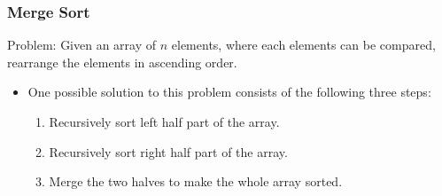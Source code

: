 \documentclass{beamer}
\begin{document}
\begin{frame}%
\frametitle{Merge Sort}


\begin{mdframed}[style=exampledefault]
Problem: Given an array of $n$ elements, where each elements can be compared, rearrange the elements in ascending order.
\end{mdframed}

\vspace{0.5cm}

\begin{itemize}

\item<2-> One possible solution to this problem consists of the following three steps:
\vspace{0.3cm}
\begin{enumerate}
\item<2-> Recursively sort left half part of the array.

\vspace{0.4cm}

\item<3-> Recursively sort right half part of the array.

\vspace{0.4cm}

\item<4-> Merge the two halves to make the whole array sorted.

\end{enumerate}

\end{itemize}

\end{frame}
\end{document}
